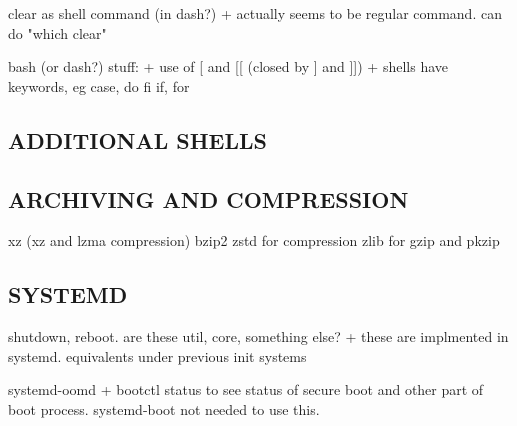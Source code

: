 clear as shell command (in dash?)
+ actually seems to be regular command. can do "which clear"

bash (or dash?) stuff:
+ use of [ and [[ (closed by ] and ]])
+ shells have keywords, eg case, do fi if, for

\subsection{ADDITIONAL SHELLS}

\subsection{ARCHIVING AND COMPRESSION}

xz (xz and lzma compression)
bzip2
zstd for compression
zlib for gzip and pkzip

\subsection{SYSTEMD}


shutdown, reboot. are these util, core, something else?
+ these are implmented in systemd. equivalents under previous init systems


systemd-oomd
+ bootctl status to see status of secure boot and other part of boot process. systemd-boot not needed to use this.



